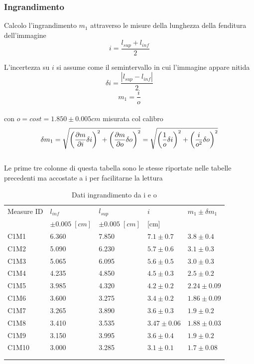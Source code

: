 \documentclass[11pt,a4paper]{article}
\begin{document}
\subsubsection{Ingrandimento}
Calcolo l'ingrandimento $m_1$ attraverso le misure della lunghezza della fenditura dell'immagine
\begin{equation}
    i = \frac{l_{sup} + l_{inf}}{2}
\end{equation}

L'incertezza su $i$ si assume come il semintervallo in cui l'immagine appare nitida
\begin{equation}
    \delta i = \frac{|l_{sup}-l_{inf}|}{2}
\end{equation}
\begin{equation}
    m_1 = \frac{i}{o}
\end{equation}
\\
con $o = cost = 1.850 \pm 0.005 cm$ misurata col calibro
\\
\begin{equation}
    \delta m_1 = \sqrt{\left(\frac{\partial m}{\partial i}\delta i\right )^2 + \left( \frac{\partial m}{\partial o} \delta o \right )^2}\\
    = \sqrt{\left( \frac{1}{o} \delta i \right)^2+ \left(\frac{i}{o^2}\delta o \right)^2}
\end{equation}
\\
Le prime tre colonne di questa tabella sono le stesse riportate nelle tabelle precedenti ma accostate a i per facilitarne la lettura 
\\
\begin{longtable}[]{@{}lllll@{}}
    \toprule
    Measure ID & $l_{inf}$ & $l_{sup}$ & $i$ & $m_1 \pm \delta m_1$ \tabularnewline
    & $\pm 0.005 \; [cm]$ & $\pm 0.005 \; [cm]$ & [cm] \tabularnewline
    \midrule
    \endhead
    C1M1  & 6.360 & 7.850 & $7.1 \pm 0.7$   & $3.8 \pm 0.4$ \tabularnewline
    C1M2  & 5.090 & 6.230 & $5.7 \pm 0.6$   & $3.1 \pm 0.3$ \tabularnewline
    C1M3  & 5.065 & 6.095 & $5.6 \pm 0.5$   & $3.0 \pm 0.3$ \tabularnewline
    C1M4  & 4.235 & 4.850 & $4.5 \pm 0.3$   & $2.5 \pm 0.2$ \tabularnewline
    C1M5  & 3.985 & 4.320 & $4.2 \pm 0.2$   & $2.24 \pm 0.09$ \tabularnewline
    C1M6  & 3.600 & 3.275 & $3.4 \pm 0.2$   & $1.86 \pm 0.09$ \tabularnewline
    C1M7  & 3.265 & 3.890 & $3.6 \pm 0.3$   & $1.9 \pm 0.2$ \tabularnewline
    C1M8  & 3.410 & 3.535 & $3.47 \pm 0.06$ & $1.88 \pm 0.03$ \tabularnewline
    C1M9  & 3.150 & 3.995 & $3.6 \pm 0.4$   & $1.9 \pm 0.2$ \tabularnewline
    C1M10 & 3.000 & 3.285 & $3.1 \pm 0.1$   & $1.7 \pm 0.08$ \tabularnewline
    \bottomrule
    \label{tab:ingrandimento}
    \\
    \caption{Dati ingrandimento da i e o}
 \end{longtable}
\end{document}
